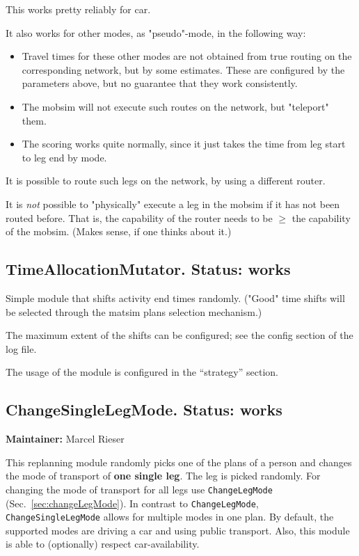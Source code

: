 This works pretty reliably for car.

It also works for other modes, as "pseudo"-mode, in the following way:
\begin{itemize}
	\item Travel times for these other modes are not obtained from true  routing on the corresponding network, but by some estimates. These  are configured by the parameters above, but no guarantee that they work  consistently.
	\item The mobsim will not execute such routes on the network, but "teleport" them.
	\item The scoring works quite normally, since it just takes the time from leg start to leg end by mode.
\end{itemize}

It is possible to route such legs on the network, by using a different router.

It is \emph{not} possible to "physically" execute a leg in the  mobsim if it has not been routed before. That is, the capability  of the router needs to be $\ge$ the capability of the mobsim.  (Makes sense, if one thinks about it.)

\subsection{TimeAllocationMutator.  Status: works}

Simple  module that shifts activity end times randomly. ("Good" time  shifts will be selected through the matsim plans selection mechanism.)

The maximum extent of the shifts can be configured; see the config  section of the log file. 

The usage of the module is configured in the ``strategy'' section.

\subsection{ChangeSingleLegMode. Status: works}

\textbf{Maintainer:} Marcel Rieser

This replanning module randomly picks one of the plans of a person and changes the mode of transport of \textbf{one single leg}. The leg is picked randomly. For changing the mode of transport for all legs use \verb$ChangeLegMode$ (Sec.~\ref{sec:changeLegMode}). In contrast to \verb$ChangeLegMode$,  \verb$ChangeSingleLegMode$ allows for multiple modes in one plan. By default,  the supported modes are driving a car and using public transport. Also,  this module is able to (optionally) respect car-availability.

